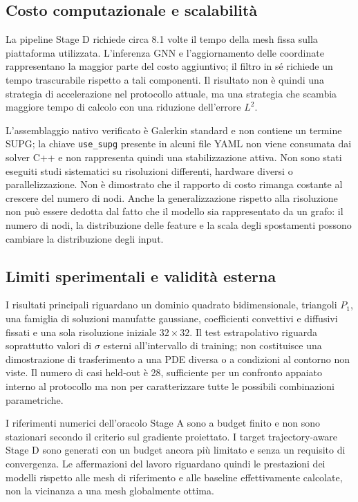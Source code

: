 \subsection{Costo computazionale e scalabilità}

La pipeline Stage D richiede circa 8.1 volte il tempo della mesh fissa sulla piattaforma utilizzata. L'inferenza GNN e l'aggiornamento delle coordinate rappresentano la maggior parte del costo aggiuntivo; il filtro in sé richiede un tempo trascurabile rispetto a tali componenti. Il risultato non è quindi una strategia di accelerazione nel protocollo attuale, ma una strategia che scambia maggiore tempo di calcolo con una riduzione dell'errore $L^2$.

L'assemblaggio nativo verificato è Galerkin standard e non contiene un termine SUPG; la chiave \texttt{use\_supg} presente in alcuni file YAML non viene consumata dai solver C++ e non rappresenta quindi una stabilizzazione attiva. Non sono stati eseguiti studi sistematici su risoluzioni differenti, hardware diversi o parallelizzazione. Non è dimostrato che il rapporto di costo rimanga costante al crescere del numero di nodi. Anche la generalizzazione rispetto alla risoluzione non può essere dedotta dal fatto che il modello sia rappresentato da un grafo: il numero di nodi, la distribuzione delle feature e la scala degli spostamenti possono cambiare la distribuzione degli input.

\subsection{Limiti sperimentali e validità esterna}

I risultati principali riguardano un dominio quadrato bidimensionale, triangoli $P_1$, una famiglia di soluzioni manufatte gaussiane, coefficienti convettivi e diffusivi fissati e una sola risoluzione iniziale $32\times32$. Il test estrapolativo riguarda soprattutto valori di $\sigma$ esterni all'intervallo di training; non costituisce una dimostrazione di trasferimento a una PDE diversa o a condizioni al contorno non viste. Il numero di casi held-out è 28, sufficiente per un confronto appaiato interno al protocollo ma non per caratterizzare tutte le possibili combinazioni parametriche.

I riferimenti numerici dell'oracolo Stage A sono a budget finito e non sono stazionari secondo il criterio sul gradiente proiettato. I target trajectory-aware Stage D sono generati con un budget ancora più limitato e senza un requisito di convergenza. Le affermazioni del lavoro riguardano quindi le prestazioni dei modelli rispetto alle mesh di riferimento e alle baseline effettivamente calcolate, non la vicinanza a una mesh globalmente ottima.

